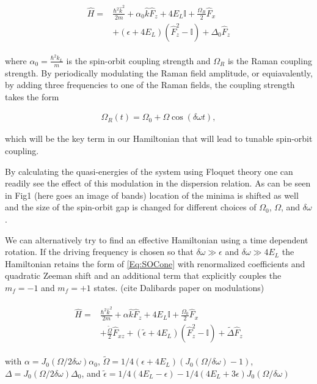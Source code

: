 \begin{align}
	\begin{split}
		\hat{H} = &\frac{\hbar^2\hat{k}^2}{2m} + \alpha_0\hat{k}\hat{F}_z +4E_L\mathbb{I} + \frac{\Omega_R}{2}\hat{F}_x\\
		& +(\epsilon+4E_L)(\hat{F}_z^2-\mathbb{I}) +\Delta_0\hat{F}_z 
		\label{Eq:SOCone}
	\end{split}
\end{align}	

where $\alpha_0=\frac{\hbar^2k_L}{m}$ is the spin-orbit coupling strength and $\Omega_R$ is the Raman coupling strength. By periodically modulating the Raman field amplitude, or equiavalently, by adding three frequencies to one of the Raman fields, the coupling strength takes the form

\begin{align}
	\Omega_R(t)=\Omega_0 + \Omega\cos(\delta\omega t),
	\label{Eq:Modulation}
\end{align}

 
which will be the key term in our Hamiltonian that will lead to tunable spin-orbit coupling. 	

By calculating the quasi-energies of the system using Floquet theory one can readily see the effect of this modulation in the dispersion relation. As can be seen in Fig1 (here goes an image of bands) location of the minima is shifted as well and the size of the spin-orbit gap is changed for different choices of $\Omega_0$, $\Omega$, and $\delta\omega$.  

 We can alternatively try to find an effective Hamiltonian using a time dependent rotation. If the driving frequency is chosen so that  $\delta\omega \gg \epsilon$ and $\delta\omega \gg 4E_L$ the Hamiltonian retains the form of \ref{Eq:SOCone} with renormalized coefficients and quadratic Zeeman shift and an additional term that explicitly couples the $m_f=-1$ and $m_f=+1$ states. (cite Dalibards paper on modulations)

\begin{align}
	\begin{split}
		\hat{H} = &\frac{\hbar^2\hat{k}^2}{2m} + \alpha\hat{k}\hat{F}_z +4E_L\mathbb{I} + \frac{\Omega_0}{2}\hat{F}_x \\
		&+ \frac{\tilde{\Omega}}{2}\hat{F}_{xz} +(\tilde{\epsilon}+4E_L)(\hat{F}_z^2-\mathbb{I}) +\tilde{\Delta}\hat{F}_z 
		\label{Eq:SOCeff}
	\end{split}
\end{align}	

with $\alpha= J_0(\Omega/2\delta\omega)\alpha_0$, $\tilde{\Omega}=1/4(\epsilon+4E_L) (J_0(\Omega/\delta\omega)-1)$, $\Delta=J_0(\Omega/2\delta\omega)\Delta_0$, and $\tilde{\epsilon}= 1/4(4E_L-\epsilon) - 
1/4(4E_L + 3 \epsilon) J_0( \Omega/\delta\omega)$


